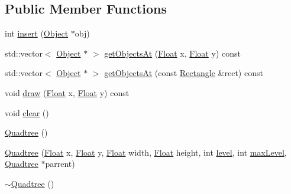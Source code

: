 \subsection*{Public Member Functions}
\begin{DoxyCompactItemize}
\item 
int \hyperlink{classZeta_1_1Quadtree_afb2c506cade7f8b766d469f4ce3d32e6}{insert} (\hyperlink{classZeta_1_1Object}{Object} $\ast$obj)
\item 
std\+::vector$<$ \hyperlink{classZeta_1_1Object}{Object} $\ast$ $>$ \hyperlink{classZeta_1_1Quadtree_ac916f81ac78c527bc2d8599fe71cd158}{get\+Objects\+At} (\hyperlink{namespaceZeta_a1e0a1265f9b3bd3075fb0fabd39088ba}{Float} x, \hyperlink{namespaceZeta_a1e0a1265f9b3bd3075fb0fabd39088ba}{Float} y) const 
\item 
std\+::vector$<$ \hyperlink{classZeta_1_1Object}{Object} $\ast$ $>$ \hyperlink{classZeta_1_1Quadtree_afd21a661f6ea079a77ee87fe84d8ce7e}{get\+Objects\+At} (const \hyperlink{classZeta_1_1Rectangle}{Rectangle} \&rect) const 
\item 
void \hyperlink{classZeta_1_1Quadtree_abaadb90723fb3241b3e7bdceff2d5365}{draw} (\hyperlink{namespaceZeta_a1e0a1265f9b3bd3075fb0fabd39088ba}{Float} x, \hyperlink{namespaceZeta_a1e0a1265f9b3bd3075fb0fabd39088ba}{Float} y) const 
\item 
void \hyperlink{classZeta_1_1Quadtree_ac4897d571c35ac8370554169a0ef69c4}{clear} ()
\item 
\hyperlink{classZeta_1_1Quadtree_a19c6688c4915a0b8988c568191d5f520}{Quadtree} ()
\item 
\hyperlink{classZeta_1_1Quadtree_a458335e4f031471bf4bc901c0e258625}{Quadtree} (\hyperlink{namespaceZeta_a1e0a1265f9b3bd3075fb0fabd39088ba}{Float} x, \hyperlink{namespaceZeta_a1e0a1265f9b3bd3075fb0fabd39088ba}{Float} y, \hyperlink{namespaceZeta_a1e0a1265f9b3bd3075fb0fabd39088ba}{Float} width, \hyperlink{namespaceZeta_a1e0a1265f9b3bd3075fb0fabd39088ba}{Float} height, int \hyperlink{classZeta_1_1Quadtree_aff9fb924702a36cd3dd1d12bcf59d61a}{level}, int \hyperlink{classZeta_1_1Quadtree_a0b93f88a779c0cbc86be78a402f287eb}{max\+Level}, \hyperlink{classZeta_1_1Quadtree}{Quadtree} $\ast$parrent)
\item 
\hyperlink{classZeta_1_1Quadtree_a2c0cabec42c1ee81ca065f54e72ebf0b}{$\sim$\+Quadtree} ()
\end{DoxyCompactItemize}
